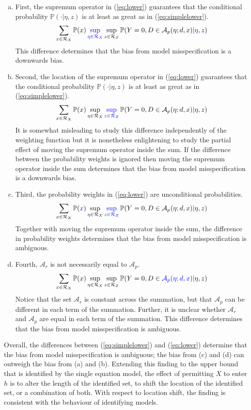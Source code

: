 \documentclass[12pt,a4paper,twoside]{article}
\numberwithin{equation}{section}
\begin{document}
\begin{enumerate}[(a)]
\item First, the supremum operator in (\ref{eq:lower}) guarantees that the conditional probability $\mathbb{P}(\cdot|\eta,z)$ is at least as great as in (\ref{eq:simplelower}).
\[\sum_{x\in\mathcal{R}_X}\mathbb{P}(\color{black}x\color{black})\color{blue}\sup_{\eta\in\mathcal{R}_X}\color{black}\sup_{z\in\mathcal{R}_Z}\color{black}\mathbb{P}(Y=0,D\in\color{black}\mathcal{A}_p(\eta;d,x)\color{black}|\color{blue}\eta\color{black},z)\]
This difference determines that the bias from model misspecification is a downwards bias. 
\item Second, the location of the supremum operator in (\ref{eq:lower}) guarantees that the conditional probability $\mathbb{P}(\cdot|\eta,z)$ is at least as great as in (\ref{eq:simplelower}).
\[\sum_{x\in\mathcal{R}_X}\mathbb{P}(\color{black}x\color{black})\color{black}\sup_{\eta\in\mathcal{R}_X}\color{blue}\sup_{z\in\mathcal{R}_Z}\color{black}\mathbb{P}(Y=0,D\in\color{black}\mathcal{A}_p(\eta;d,x)\color{black}|\color{black}\eta\color{black},z)\]
It is somewhat misleading to study this difference independently of the weighting function but it is nonetheless enlightening to study the partial effect of moving the supremum operator inside the sum. If the difference between the probability weights is ignored then moving the supremum operator inside the sum determines that the bias from model misspecification is a downwards bias.
\item Third, the probability weights in (\ref{eq:lower}) are unconditional probabilities.
\[\sum_{x\in\mathcal{R}_X}\mathbb{P}(\color{blue}x\color{black})\color{black}\sup_{\eta\in\mathcal{R}_X}\color{blue}\sup_{z\in\mathcal{R}_Z}\color{black}\mathbb{P}(Y=0,D\in\color{black}\mathcal{A}_p(\eta;d,x)\color{black}|\color{black}\eta\color{black},z)\]
Together with moving the supremum operator inside the sum, the difference in probability weights determines that the bias from model misspecification is ambiguous. 
\item Fourth, $\mathcal{A}_r$ is not necessarily equal to $\mathcal{A}_p$.
\[\sum_{x\in\mathcal{R}_X}\mathbb{P}(\color{black}x\color{black})\color{black}\sup_{\eta\in\mathcal{R}_X}\color{black}\sup_{z\in\mathcal{R}_Z}\color{black}\mathbb{P}(Y=0,D\in\color{blue}\mathcal{A}_p(\eta;d,x)\color{black}|\color{black}\eta\color{black},z)\] 
Notice that the set $\mathcal{A}_r$ is constant across the summation, but that $\mathcal{A}_p$ can be different in each term of the summation. Further, it is unclear whether $\mathcal{A}_r$ and $\mathcal{A}_p$ are equal in each term of the summation. This difference determines that the bias from model misspecification is ambiguous.
\end{enumerate} 
Overall, the  differences between (\ref{eq:simplelower}) and (\ref{eq:lower}) determine that the bias from model misspecification is ambiguous; the bias from (c) and (d) can outweigh the bias from (a) and (b). Extending this finding to the upper bound that is identified by the single equation model, the effect of permitting $X$ to enter $h$ is to alter the length of the identified set, to shift the location of the identified set, or a combination of both. With respect to location shift, the finding is consistent with the behaviour of identifying models.  
\end{document}
